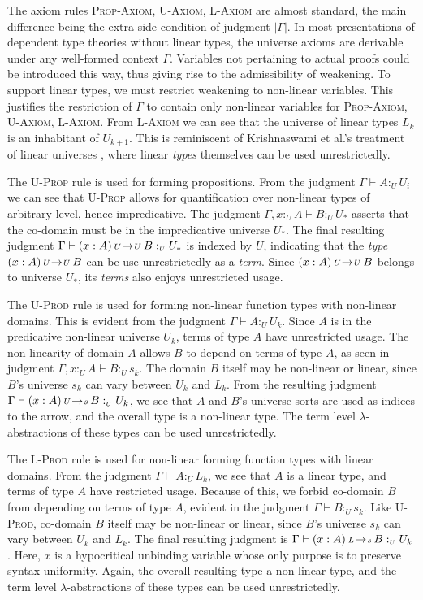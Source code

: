 \documentclass{article}
\theoremstyle{definition}
\newcommand{\rname}[1]{\textsc{\footnotesize #1}}
\newcommand{\pure}[1]{|#1|}
\newcommand{\utype}{:_{\scriptscriptstyle U}}
\newcommand{\arw}[2]
{\hspace*{0.2em}{\scriptstyle #1}\hspace*{-0.2em}
\rightarrow
\hspace*{-0.2em}{\scriptstyle #2}\hspace*{0.2em}}
\begin{document}
  The axiom rules \rname{Prop-Axiom}, \rname{U-Axiom}, \rname{L-Axiom} are almost standard, the main difference being the extra side-condition of judgment $\pure{\Gamma}$. In most presentations of dependent type theories without linear types, the universe axioms are derivable under any well-formed context $\Gamma$. Variables not pertaining to actual proofs could be introduced this way, thus giving rise to the admissibility of weakening. To support linear types, we must restrict weakening to non-linear variables. This justifies the restriction of $\Gamma$ to contain only non-linear variables for \rname{Prop-Axiom}, \rname{U-Axiom}, \rname{L-Axiom}. From \rname{L-Axiom} we can see that the universe of linear types $L_k$ is an inhabitant of $U_{k+1}$. This is reminiscent of Krishnaswami et al.'s treatment of linear universes \cite{neel15}, where linear \textit{types} themselves can be used unrestrictedly.

  The \rname{U-Prop} rule is used for forming propositions. From the judgment $\Gamma \vdash A \utype U_i$ we can see that \rname{U-Prop} allows for quantification over non-linear types of arbitrary level, hence impredicative. The judgment $\Gamma, x \utype A \vdash B \utype U_*$ asserts that the co-domain must be in the impredicative universe $U_*$. The final resulting judgment $\Gamma \vdash (x : A) \arw{U}{U} B \utype U_*$ is indexed by $U$, indicating that the \textit{type} $(x : A) \arw{U}{U} B$ can be use unrestrictedly as a \textit{term}. Since $(x : A) \arw{U}{U} B$ belongs to universe $U_*$, its \textit{terms} also enjoys unrestricted usage.

  The \rname{U-Prod} rule is used for forming non-linear function types with non-linear domains. This is evident from the judgment $\Gamma \vdash A \utype U_k$. Since $A$ is in the predicative non-linear universe $U_k$, terms of type $A$ have unrestricted usage. The non-linearity of domain $A$ allows $B$ to depend on terms of type $A$, as seen in judgment $\Gamma, x \utype A \vdash B \utype s_k$. The domain $B$ itself may be non-linear or linear, since $B$'s universe $s_k$ can vary between $U_k$ and $L_k$. From the resulting judgment $\Gamma \vdash (x : A) \arw{U}{s} B \utype U_k$, we see that $A$ and $B$'s universe sorts are used as indices to the arrow, and the overall type is a non-linear type. The term level $\lambda$-abstractions of these types can be used unrestrictedly.

  The \rname{L-Prod} rule is used for non-linear forming function types with linear domains. From the judgment $\Gamma \vdash A \utype L_k$, we see that $A$ is a linear type, and terms of type $A$ have restricted usage. Because of this, we forbid co-domain $B$ from depending on terms of type $A$, evident in the judgment $\Gamma \vdash B \utype s_k$. Like \rname{U-Prod}, co-domain $B$ itself may be non-linear or linear, since $B$'s universe $s_k$ can vary between $U_k$ and $L_k$. The final resulting judgment is $\Gamma \vdash (x : A) \arw{L}{s} B \utype U_k$. Here, $x$ is a hypocritical unbinding variable whose only purpose is to preserve syntax uniformity. Again, the overall resulting type a non-linear type, and the term level $\lambda$-abstractions of these types can be used unrestrictedly.
\end{document}
